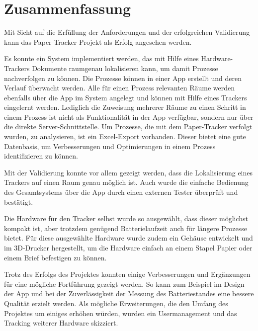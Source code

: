 \chapter{Zusammenfassung}

Mit Sicht auf die Erfüllung der Anforderungen und der erfolgreichen Validierung kann das Paper-Tracker Projekt als
Erfolg angesehen werden.

Es konnte ein System implementiert werden, das mit Hilfe eines Hardware-Trackers Dokumente
raumgenau lokalisieren kann, um damit Prozesse nachverfolgen zu können.
Die Prozesse können in einer App erstellt und deren Verlauf überwacht werden.
Alle für einen Prozess relevanten Räume werden ebenfalls über die App im System angelegt und können mit Hilfe eines
Trackers eingelernt werden.
Lediglich die Zuweisung mehrerer Räume zu einen Schritt in einem Prozess ist nicht als Funktionalität in der App
verfügbar, sondern nur über die direkte Server-Schnittstelle.
Um Prozesse, die mit dem Paper-Tracker verfolgt wurden, zu analysieren, ist ein Excel-Export vorhanden.
Dieser bietet eine gute Datenbasis, um Verbesserungen und Optimierungen in einem Prozess identifizieren zu können.

Mit der Validierung konnte vor allem gezeigt werden, dass die Lokalisierung eines Trackers auf einen Raum genau möglich ist.
Auch wurde die einfache Bedienung des Gesamtsystems über die App durch einen externen Tester überprüft und bestätigt.

Die Hardware für den Tracker selbst wurde so ausgewählt, dass dieser möglichst kompakt ist, aber trotzdem genügend
Batterielaufzeit auch für längere Prozesse bietet.
Für diese ausgewählte Hardware wurde zudem ein Gehäuse entwickelt und im 3D-Drucker hergestellt, um die Hardware
einfach an einem Stapel Papier oder einem Brief befestigen zu können.

Trotz des Erfolgs des Projektes konnten einige Verbesserungen und Ergänzungen für eine mögliche Fortführung gezeigt werden.
So kann zum Beispiel im Design der App und bei der Zuverlässigkeit der Messung des Batteriestandes eine bessere Qualität erzielt werden.
Als mögliche Erweiterungen, die den Umfang des Projektes um einiges erhöhen würden, wurden ein Usermanagement und das Tracking weiterer Hardware skizziert.